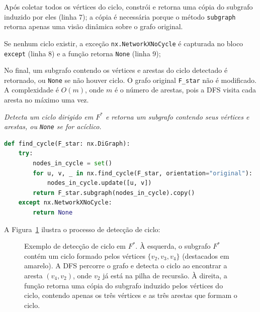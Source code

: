 Após coletar todos os vértices do ciclo, constrói e retorna uma cópia do subgrafo induzido por eles (linha 7); a cópia é necessária porque o método \texttt{subgraph} retorna apenas uma visão dinâmica sobre o grafo original.

Se nenhum ciclo existir, a exceção \texttt{nx.NetworkXNoCycle} é capturada no bloco \texttt{except} (linha 8) e a função retorna \texttt{None} (linha 9);

No final, um subgrafo contendo os vértices e arestas do ciclo detectado é retornado, ou \texttt{None} se não houver ciclo. O grafo original \texttt{F\_star} não é modificado. A complexidade é \(O(m)\), onde \(m\) é o número de arestas, pois a DFS visita cada aresta no máximo uma vez.

\begin{tcolorbox}[
        enhanced, breakable,
        colframe=blue!60!black, colback=blue!2,
        colbacktitle=blue!15, coltitle=black,
        title={Detecção de ciclo dirigido em $F^*$},
        boxed title style={sharp corners, boxrule=0.6pt},
        sharp corners, boxrule=0.6pt
    ]
    \emph{Detecta um ciclo dirigido em $F^*$ e retorna um subgrafo contendo seus vértices e arestas, ou \texttt{None} se for acíclico.}
    \tcblower
    \begin{lstlisting}[mathescape=true, language=Python]
def find_cycle(F_star: nx.DiGraph):
    try:
        nodes_in_cycle = set()
        for u, v, _ in nx.find_cycle(F_star, orientation="original"):
            nodes_in_cycle.update([u, v])
        return F_star.subgraph(nodes_in_cycle).copy()
    except nx.NetworkXNoCycle:
        return None  
\end{lstlisting}
\end{tcolorbox}

A Figura~\ref{fig:find-cycle-example} ilustra o processo de detecção de ciclo:

\begin{figure}[H]
    \centering
    
    \caption{Exemplo de detecção de ciclo em \(F^*\). À esquerda, o subgrafo \(F^*\) contém um ciclo formado pelos vértices \(\{v_2, v_3, v_4\}\) (destacados em amarelo). A DFS percorre o grafo e detecta o ciclo ao encontrar a aresta \((v_4, v_2)\), onde \(v_2\) já está na pilha de recursão. À direita, a função retorna uma cópia do subgrafo induzido pelos vértices do ciclo, contendo apenas os três vértices e as três arestas que formam o ciclo.}
    \label{fig:find-cycle-example}
\end{figure}

